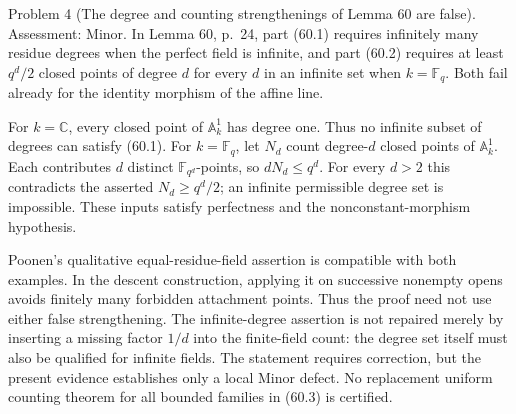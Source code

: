\documentclass[10pt]{article}
\begin{document}
Problem 4 (The degree and counting strengthenings of Lemma 60 are false).  Assessment: Minor. In Lemma 60, p. 24, part (60.1) requires infinitely many residue degrees when the perfect field is infinite, and part (60.2) requires at least \(q^d/2\) closed points of degree \(d\) for every \(d\) in an infinite set when \(k=\mathbb F_q\). Both fail already for the identity morphism of the affine line.\par
For \(k=\mathbb C\), every closed point of \(\mathbb A^1_k\) has degree one. Thus no infinite subset of degrees can satisfy (60.1). For \(k=\mathbb F_q\), let \(N_d\) count degree-\(d\) closed points of \(\mathbb A^1_k\). Each contributes \(d\) distinct \(\mathbb F_{q^d}\)-points, so \(dN_d\leq q^d\). For every \(d>2\) this contradicts the asserted \(N_d\geq q^d/2\); an infinite permissible degree set is impossible. These inputs satisfy perfectness and the nonconstant-morphism hypothesis.\par
Poonen’s qualitative equal-residue-field assertion is compatible with both examples. In the descent construction, applying it on successive nonempty opens avoids finitely many forbidden attachment points. Thus the proof need not use either false strengthening. The infinite-degree assertion is not repaired merely by inserting a missing factor \(1/d\) into the finite-field count: the degree set itself must also be qualified for infinite fields. The statement requires correction, but the present evidence establishes only a local Minor defect. No replacement uniform counting theorem for all bounded families in (60.3) is certified.\par
\end{document}
